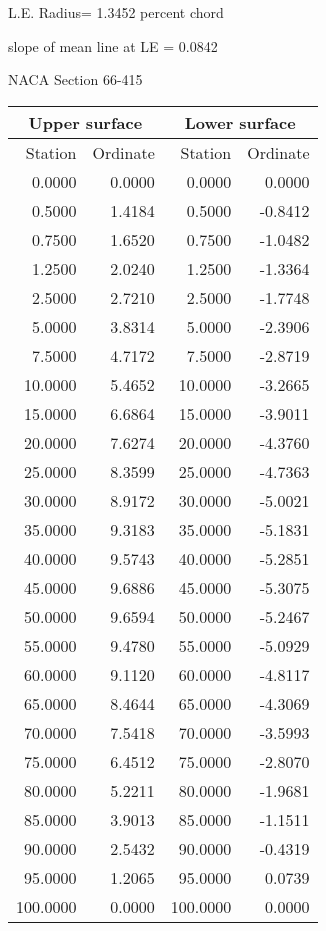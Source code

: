 \documentclass[11pt]{book}
\begin{document}
L.E. Radius=  1.3452 percent chord


 slope of mean line at LE =  0.0842
 \newpage
  \label{s66-415}
 \begin{Large}
 NACA Section 66-415
 \end{Large}
  
 \vspace{8mm}
 \begin{tabular}{|r|r|r|r|} \hline 
 \multicolumn{2}{|c|}{Upper surface} & \multicolumn{2}{|c|}{Lower surface} \\
 \hline
 Station & Ordinate & Station & Ordinate \\
 \hline
0.0000 & 0.0000 & 0.0000 & 0.0000 \\
0.5000 & 1.4184 & 0.5000 & -0.8412 \\
0.7500 & 1.6520 & 0.7500 & -1.0482 \\
1.2500 & 2.0240 & 1.2500 & -1.3364 \\
2.5000 & 2.7210 & 2.5000 & -1.7748 \\
5.0000 & 3.8314 & 5.0000 & -2.3906 \\
7.5000 & 4.7172 & 7.5000 & -2.8719 \\
10.0000 & 5.4652 & 10.0000 & -3.2665 \\
15.0000 & 6.6864 & 15.0000 & -3.9011 \\
20.0000 & 7.6274 & 20.0000 & -4.3760 \\
25.0000 & 8.3599 & 25.0000 & -4.7363 \\
30.0000 & 8.9172 & 30.0000 & -5.0021 \\
35.0000 & 9.3183 & 35.0000 & -5.1831 \\
40.0000 & 9.5743 & 40.0000 & -5.2851 \\
45.0000 & 9.6886 & 45.0000 & -5.3075 \\
50.0000 & 9.6594 & 50.0000 & -5.2467 \\
55.0000 & 9.4780 & 55.0000 & -5.0929 \\
60.0000 & 9.1120 & 60.0000 & -4.8117 \\
65.0000 & 8.4644 & 65.0000 & -4.3069 \\
70.0000 & 7.5418 & 70.0000 & -3.5993 \\
75.0000 & 6.4512 & 75.0000 & -2.8070 \\
80.0000 & 5.2211 & 80.0000 & -1.9681 \\
85.0000 & 3.9013 & 85.0000 & -1.1511 \\
90.0000 & 2.5432 & 90.0000 & -0.4319 \\
95.0000 & 1.2065 & 95.0000 & 0.0739 \\
100.0000 & 0.0000 & 100.0000 & 0.0000 \\
 \hline 
 \end{tabular}
\end{document}

